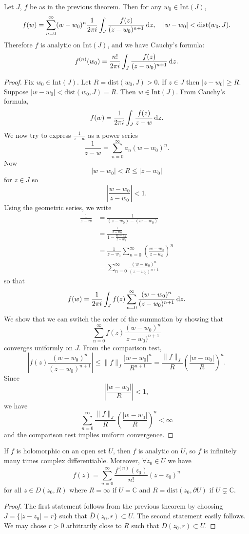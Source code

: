 \begin{theorem}
Let $J$, $f$ be as in the previous theorem. Then for any
$w_0 \in \mathrm{Int}(J)$,
$$
f(w) =
\sum_{n=0}^\infty
  (w - w_0)^n
  \frac{1}{2 \pi i}
  \int_J
    \frac{f(z)}{(z - w_0)^{n+1}}
    \mathop{}\!\mathrm{d} z, \quad
|w - w_0| < \mathrm{dist}(w_0, J).
$$
Therefore $f$ is analytic on $\mathrm{Int}(J)$, and
we have Cauchy's formula:
$$
f^{(n)}(w_0) =
\frac{n!}{2 \pi i}
\int_J
  \frac{f(z)}{(z - w_0)^{n+1}}
  \mathop{}\!\mathrm{d} z.
$$
\end{theorem}
\begin{proof}
Fix $w_0 \in \mathrm{Int}(J)$. Let $R = \mathrm{dist}(w_0, J) > 0$.
If $z \in J$ then $|z - w_0| \geq R$. Suppose
$|w - w_0| < \mathrm{dist}(w_0, J) = R$. Then
$w \in \mathrm{Int}(J)$. From Cauchy's formula,
$$
f(w) = \frac{1}{2 \pi i} \int_J \frac{f(z)}{z - w} \mathop{}\!\mathrm{d} z.
$$
We now try to express $\frac{1}{z - w}$ as a power series
$$
\frac{1}{z - w} = \sum_{n=0}^\infty a_n (w - w_0)^n.
$$
Now
$$
|w - w_0| < R \leq |z - w_0|
$$
for $z \in J$ so
$$
\left|\frac{w - w_0}{z - w_0}\right| < 1.
$$
Using the geometric series, we write
\begin{align*}
   \frac{1}{z - w}
&= \frac{1}{(z - w_0) - (w - w_0)} \\
&= \frac{\frac{1}{z - w_0}}{1 - \frac{w - w_0}{z - w_0}} \\
&= \frac{1}{z - w_0}
   \sum_{n=0}^\infty
     \left(
       \frac{w - w_0}{z - w_0}
     \right)^n \\
&= \sum_{n=0}^\infty
     \frac{(w - w_0)^n}{(z - w_0)^{n+1}}
\end{align*}
so that
$$
f(w) =
\frac{1}{2 \pi i}
\int_J
  f(z)
  \sum_{n=0}^\infty
    \frac{(w - w_0)^n}{(z - w_0)^{n+1}}
    \mathop{}\!\mathrm{d} z.
$$
We show that we can switch the order of the summation
by showing that
$$
\sum_{n=0}^\infty f(z) \frac{(w - w_0)^n}{z - w_0)^{n+1}}
$$
converges uniformly on $J$.
From the comparison test,
$$
\left|
  f(z) \frac{(w - w_0)^n}{(z - w_0)^{n+1}}
\right|
\leq
\| f \|_J
\frac{|w - w_0|^n}{R^{n+1}}
=
\frac{\| f \|_J}{R}
\left(\frac{|w - w_0|}{R}\right)^n.
$$
Since
$$
\left|
  \frac{|w - w_0|}{R}
\right|
< 1,
$$
we have
$$
\sum_{n=0}^\infty
  \frac{\| f \|_J}{R}
  \left(\frac{|w - w_0|}{R}\right)^n
< \infty
$$
and the comparison test implies uniform convergence.
\end{proof}

\begin{corol}
If $f$ is holomorphic on an open set $U$, then $f$ is analytic on $U$,
so $f$ is infinitely many times complex differentiable. Moreover,
$\forall z_0 \in U$ we have
$$
f(z) = \sum_{n=0}^\infty \frac{f^{(n)}(z_0)}{n!} (z - z_0)^n
$$
for all $z \in D(z_0, R)$ where $R = \infty$ if $U = \mathbb{C}$ and
$R = \mathrm{dist}(z_0, \partial U)$ if $U \subsetneq \mathbb{C}$.
\end{corol}

\begin{proof}
The first statement follows from the previous theorem by choosing
$J = \{ |z - z_0| = r \}$ such that $\bar{D}(z_0, r) \subset U$.
The second statement easily follows.
We may chose $r > 0$ arbitrarily close to $R$ such that
$\bar{D}(z_0, r) \subset U$.
\end{proof}
